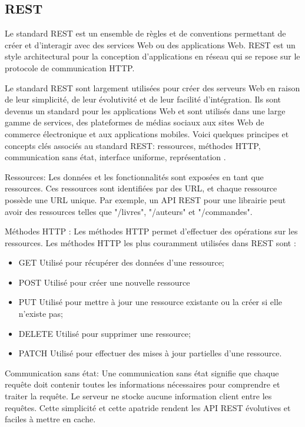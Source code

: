 \subsection{REST}

Le standard REST est un ensemble de règles et de conventions permettant de créer et d'interagir avec des services Web ou des applications Web. REST est un style architectural pour la conception d'applications en réseau qui se repose sur le protocole de communication HTTP. \cite{RESTChap5}

Le standard REST sont largement utilisées pour créer des serveurs Web en raison de leur simplicité, de leur évolutivité et de leur facilité d'intégration. Ils sont devenus un standard pour les applications Web et sont utilisés dans une large gamme de services, des plateformes de médias sociaux aux sites Web de commerce électronique et aux applications mobiles. Voici quelques principes et concepts clés associés au standard REST: ressources, méthodes HTTP, communication sans état, interface uniforme, représentation \cite{RESTChap5}.

Ressources: Les données et les fonctionnalités sont exposées en tant que ressources. Ces ressources sont identifiées par des URL, et chaque ressource possède une URL unique. Par exemple, un API REST pour une librairie peut avoir des ressources telles que "/livres", "/auteurs" et "/commandes".

Méthodes HTTP : Les méthodes HTTP permet d'effectuer des opérations sur les ressources. Les méthodes HTTP les plus couramment utilisées dans REST sont :
\begin{itemize}
    \item GET Utilisé pour récupérer des données d'une ressource;
    \item POST Utilisé pour créer une nouvelle ressource
    \item PUT Utilisé pour mettre à jour une ressource existante ou la créer si elle n'existe pas;
    \item DELETE Utilisé pour supprimer une ressource;
    \item PATCH Utilisé pour effectuer des mises à jour partielles d'une ressource.
\end{itemize}


Communication sans état: Une communication sans état signifie que chaque requête doit contenir toutes les informations nécessaires pour comprendre et traiter la requête. Le serveur ne stocke aucune information client entre les requêtes. Cette simplicité et cette apatride rendent les API REST évolutives et faciles à mettre en cache.

